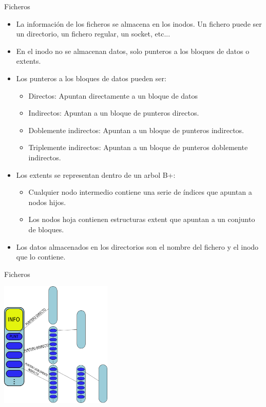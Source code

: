 \begin{frame}{Ficheros}
  \begin{itemize}
    \item La información de los ficheros se almacena en los inodos. Un fichero puede ser un directorio, un fichero regular, un socket, etc...
    \item En el inodo no se almacenan datos, solo punteros a los bloques de datos o extents.
    \item Los punteros a los bloques de datos pueden ser:
    \begin{itemize}
      \item Directos: Apuntan directamente a un bloque de datos
      \item Indirectos: Apuntan a un bloque de punteros directos.
      \item Doblemente indirectos: Apuntan a un bloque de punteros indirectos.
      \item Triplemente indirectos: Apuntan a un bloque de punteros doblemente indirectos.
    \end{itemize}
    \item Los extents se representan dentro de un arbol B+:
    \begin{itemize}
      \item Cualquier nodo intermedio contiene una serie de índices que apuntan a nodos hijos.
      \item Los nodos hoja contienen estructuras extent que apuntan a un conjunto de bloques.
    \end{itemize}
    \item Los datos almacenados en los directorios son el nombre del fichero y el inodo que lo contiene.
  \end{itemize}
\end{frame}

\begin{frame}{Ficheros}
  \begin{center}
    \includegraphics[height=6cm]{imgs/ext_files.png}
  \end{center}
\end{frame}
